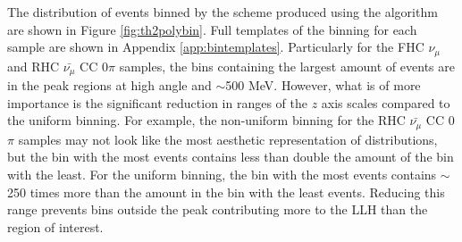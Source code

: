 The distribution of events binned by the scheme produced using the algorithm are shown in Figure \ref{fig:th2polybin}. Full templates of the binning for each sample are shown in Appendix \ref{app:bintemplates}. Particularly for the FHC $\nu_{\mu}$ and RHC $\bar{\nu_{\mu}}$ CC 0$\pi$ samples, the bins containing the largest amount of events are in the peak regions at high angle and $\sim$500 MeV. However, what is of more importance is the significant reduction in ranges of the $z$ axis scales compared to the uniform binning. For example, the non-uniform binning for the RHC $\bar{\nu_{\mu}}$ CC 0$\pi$ samples may not look like the most aesthetic representation of distributions, but the bin with the most events contains less than double the amount of the bin with the least. For the uniform binning, the bin with the most events contains $\sim$250 times more than the amount in the bin with the least events. Reducing this range prevents bins outside the peak contributing more to the LLH than the region of interest.

